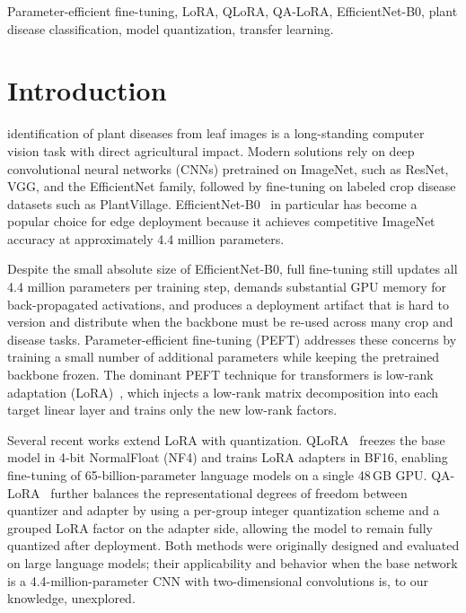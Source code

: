 \documentclass[conference]{IEEEtran}
\begin{document}
\begin{IEEEkeywords}
Parameter-efficient fine-tuning, LoRA, QLoRA, QA-LoRA, EfficientNet-B0, plant disease classification, model quantization, transfer learning.
\end{IEEEkeywords}

\section{Introduction}
 identification of plant diseases from leaf images is a long-standing computer vision task with direct agricultural impact. Modern solutions rely on deep convolutional neural networks (CNNs) pretrained on ImageNet, such as ResNet, VGG, and the EfficientNet family, followed by fine-tuning on labeled crop disease datasets such as PlantVillage. EfficientNet-B0~\cite{tan2019efficientnet} in particular has become a popular choice for edge deployment because it achieves competitive ImageNet accuracy at approximately 4.4 million parameters.

Despite the small absolute size of EfficientNet-B0, full fine-tuning still updates all 4.4 million parameters per training step, demands substantial GPU memory for back-propagated activations, and produces a deployment artifact that is hard to version and distribute when the backbone must be re-used across many crop and disease tasks. Parameter-efficient fine-tuning (PEFT) addresses these concerns by training a small number of additional parameters while keeping the pretrained backbone frozen. The dominant PEFT technique for transformers is low-rank adaptation (LoRA)~\cite{hu2021lora}, which injects a low-rank matrix decomposition into each target linear layer and trains only the new low-rank factors.

Several recent works extend LoRA with quantization. QLoRA~\cite{dettmers2023qlora} freezes the base model in 4-bit NormalFloat (NF4) and trains LoRA adapters in BF16, enabling fine-tuning of 65-billion-parameter language models on a single 48\,GB GPU. QA-LoRA~\cite{xu2024qalora} further balances the representational degrees of freedom between quantizer and adapter by using a per-group integer quantization scheme and a grouped LoRA factor on the adapter side, allowing the model to remain fully quantized after deployment. Both methods were originally designed and evaluated on large language models; their applicability and behavior when the base network is a 4.4-million-parameter CNN with two-dimensional convolutions is, to our knowledge, unexplored.
\end{document}
